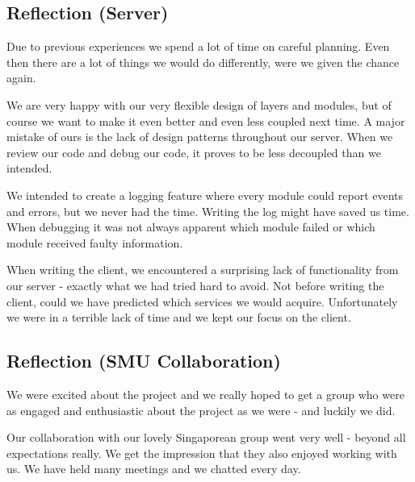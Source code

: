 \subsection{Reflection (Server)}
Due to previous experiences we spend a lot of time on careful planning. Even then there are a lot of things we would do differently, were we given the chance again.

We are very happy with our very flexible design of layers and modules, but of course we want to make it even better and even less coupled next time. A major mistake of ours is the lack of design patterns throughout our server. When we review our code and debug our code, it proves to be less decoupled than we intended. 

We intended to create a logging feature where every module could report events and errors, but we never had the time. Writing the log might have saved us time. When debugging it was not always apparent which module failed or which module received faulty information. 

When writing the client, we encountered a surprising lack of functionality from our server - exactly what we had tried hard to avoid. Not before writing the client, could we have predicted which services we would acquire. Unfortunately we were in a terrible lack of time and we kept our focus on the client.

\subsection{Reflection (SMU Collaboration)}
We were excited about the project and we really hoped to get a group who were as engaged and enthusiastic about the project as we were - and luckily we did.

Our collaboration with our lovely Singaporean group went very well - beyond all expectations really. We get the impression that they also enjoyed working with us. We have held many meetings and we chatted every day.
\newpage
